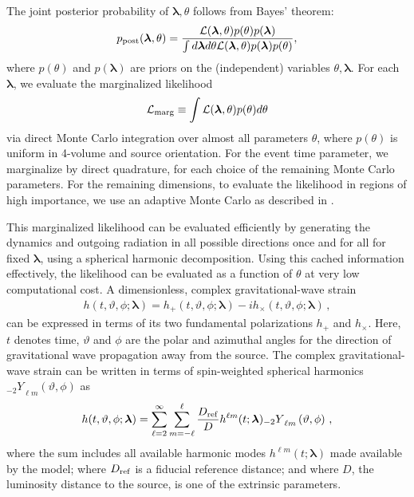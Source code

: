 \documentclass[twocolumn,prd,nofootinbib]{revtex4}
\newcommand\Y[1]{{{}_{#1}Y}}
\begin{document}
The joint posterior probability of $\bm{\lambda} ,\theta$ follows from Bayes' theorem:
\begin{equation}
p_{\rm post}(\bm{\lambda} ,\theta)=\frac{ {\cal L}(\bm{\lambda} ,\theta)p(\theta)p(\bm{\lambda})}{\int d\bm{\lambda} d\theta {\cal L}(\bm{\lambda} ,\theta)p(\bm{\lambda})p(\theta)},
\end{equation}
where $p(\theta)$ and $p(\bm{\lambda})$ are priors on the (independent) variables $\theta ,\bm{\lambda}$. For each $\bm{\lambda}$, we evaluate the marginalized likelihood
\begin{equation}
\label{eq:lnLmarg}
 {\cal L}_{\rm marg}\equiv\int  {\cal L}(\bm{\lambda} ,\theta )p(\theta )d\theta
\end{equation}
via direct Monte Carlo integration over almost all parameters $\theta$, where $p(\theta)$ is uniform in 4-volume and source orientation.  
For the event time parameter, we marginalize by direct quadrature, for each choice of the remaining Monte Carlo parameters.
For the remaining dimensions, to evaluate the likelihood in regions of high importance, we use an adaptive Monte Carlo as described in
\cite{gwastro-PE-AlternativeArchitectures}.    


This marginalized likelihood can be evaluated efficiently
by  generating the dynamics and outgoing radiation in all possible directions once and for all for fixed
$\bm{\lambda}$, using a spherical harmonic decomposition.  Using this cached information effectively,  the likelihood can be evaluated as a function of $\theta$ at very low computational cost.  
A dimensionless, complex gravitational-wave
strain
\begin{align} \label{eq:strain}
h(t,\vartheta,\phi;\bm{\lambda}) =  h_+(t,\vartheta,\phi;\bm{\lambda}) - 
                                i h_\times (t,\vartheta,\phi;\bm{\lambda}) \, ,
\end{align}
can be expressed in terms of its two fundamental polarizations $h_+$ and $h_\times$.
Here, $t$ denotes time, $\vartheta$ and $\phi$ are the polar and azimuthal angles
for the direction of gravitational wave propagation away from the source. 
The complex gravitational-wave strain can be written in terms of
spin-weighted spherical harmonics $\Y{-2}_{\ell m} \left(\vartheta, \phi \right)$ as 
\begin{align} \label{eq:strain_mode}
h(t,\vartheta,\phi;\bm{\lambda}) = 
\sum_{\ell=2}^{\infty} \sum_{m=-\ell}^{\ell} \frac{D_{\rm ref}}{D} h^{\ell m}(t;\bm{\lambda}) \Y{-2}_{\ell m} \left(\vartheta, \phi \right) \, ,
\end{align}
where the sum includes all available harmonic modes $h^{\ell m}(t;\pmb{\bm{\lambda}})$ made available by the model;  where
$D_{\rm ref}$ is a fiducial reference distance; and where $D$, the luminosity distance to the  source, is one of the
extrinsic parameters.  
\end{document}
